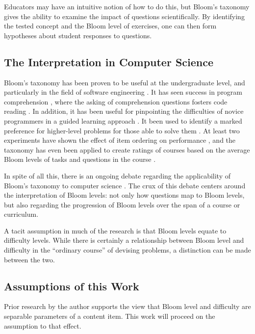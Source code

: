 Educators may have an intuitive notion of how to do this, but Bloom's taxonomy
gives the ability to examine the impact of questions scientifically.  By
identifying the tested concept and the Bloom level of exercises, one can then
form hypotheses about student responses to questions.  

\subsection{The Interpretation in Computer Science}

Bloom's taxonomy has been proven to be useful at the undergraduate level, and
particularly in the field of software engineering \cite{britto2015,
mahmood2014}.  It has seen success in program comprehension
\cite{buckley2003}, where the asking of comprehension questions fosters code
reading \cite{losada2008}. In addition, it has been useful for pinpointing the
difficulties of novice programmers in a guided learning approach
\cite{shuhidan2011}.  It been used to identify a marked preference for
higher-level problems for those able to solve them \cite{bruyn2011}
\cite{goel2004}.  At least two experiments have shown the effect of item
ordering on performance \cite{newman1988effect,castleberry2016effect}, and the
taxonomy has even been applied to create ratings of courses based on the
average Bloom levels of tasks and questions in the course
\cite{oliver2004course}.

In spite of all this, there is an ongoing debate regarding the applicability of
Bloom's taxonomy to computer science \cite{johnson2006bloom,
fuller2007developing, thompson2008bloom}.  The crux of this debate centers
around the interpretation of Bloom levels: not only how questions map to Bloom
levels, but also regarding the progression of Bloom levels over the span of a
course or curriculum.  

A tacit assumption in much of the research is that Bloom levels equate to
difficulty levels.  While there is certainly a relationship between Bloom level
and difficulty in the ``ordinary course'' of devising problems, a distinction
can be made between the two.


\subsection{Assumptions of this Work}

Prior research by the author supports the view that Bloom level and difficulty
are separable parameters of a content item.  This work will proceed on the
assumption to that effect. 

